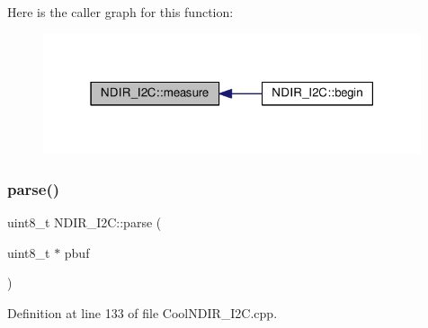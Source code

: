 Here is the caller graph for this function\+:\nopagebreak
\begin{figure}[H]
\begin{center}
\leavevmode
\includegraphics[width=315pt]{d6/ddb/class_n_d_i_r___i2_c_ab8f50d38501d498b802b822bd4844ede_icgraph}
\end{center}
\end{figure}
\mbox{\label{class_n_d_i_r___i2_c_a907b756fc9244c7398b7d187b73cde94}} 
\subsubsection{\texorpdfstring{parse()}{parse()}}
{\footnotesize\ttfamily uint8\+\_\+t N\+D\+I\+R\+\_\+\+I2\+C\+::parse (\begin{DoxyParamCaption}\item[{uint8\+\_\+t $\ast$}]{pbuf }\end{DoxyParamCaption})\hspace{0.3cm}{\ttfamily [private]}}



Definition at line 133 of file Cool\+N\+D\+I\+R\+\_\+\+I2\+C.\+cpp.


